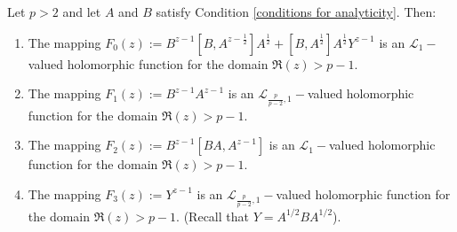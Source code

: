     \begin{lem}\label{trivial analytic lemma} 
        Let $p>2$ and let $A$ and $B$ satisfy Condition \ref{conditions for analyticity}. Then:
        \begin{enumerate}[{\rm (i)}]
            \item\label{triv0} The mapping $F_0(z) := B^{z-1}[B,A^{z-\frac12}]A^{\frac12}+[B,A^{\frac12}]A^{\frac12}Y^{z-1}$ is an $\mathcal{L}_1-$valued 
                                holomorphic function for the domain $\Re(z)>p-1.$
            \item\label{triv1} The mapping $F_1(z) := B^{z-1}A^{z-1}$ is an $\mathcal{L}_{\frac{p}{p-2},1}-$valued holomorphic function for the domain $\Re(z)>p-1.$
            \item\label{triv2} The mapping $F_2(z) := B^{z-1}[BA,A^{z-1}]$ is an $\mathcal{L}_1-$valued holomorphic function for the domain $\Re(z)>p-1.$
            \item\label{triv3} The mapping $F_3(z) := Y^{z-1}$ is an $\mathcal{L}_{\frac{p}{p-2},1}-$valued holomorphic function for the domain $\Re(z)>p-1.$ (Recall that $Y = A^{1/2}BA^{1/2}$).
        \end{enumerate}
    \end{lem}
